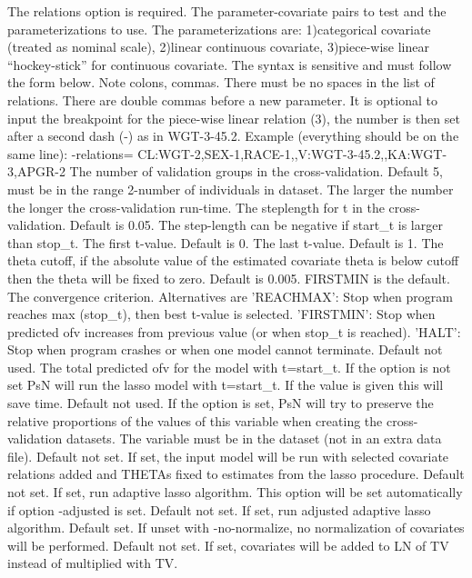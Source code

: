 \begin{optionlist}
The relations option is required. The parameter-covariate pairs to test and the parameterizations to use. The parameterizations are: 1)categorical covariate (treated as nominal scale), 2)linear continuous covariate, 3)piece-wise linear “hockey-stick” for continuous covariate. The syntax is sensitive and must follow the form below. Note colons, commas. There must be no spaces in the list of relations. There are double commas before a new parameter. It is optional to input the breakpoint for the piece-wise linear relation (3), the number is then set after a second dash (-) as in WGT-3-45.2. Example (everything should be on the same line):		-relations= CL:WGT-2,SEX-1,RACE-1,,V:WGT-3-45.2,,KA:WGT-3,APGR-2 
\nextopt
{}
The number of validation groups in the cross-validation. Default 5, must be in the range 2-number of individuals in dataset. The larger the number the longer the cross-validation run-time. 
\nextopt
{}
The steplength for t in the cross-validation. Default is 0.05. The step-length can be negative if start\_t is larger than stop\_t. 
\nextopt
{}
The first t-value. Default is 0. 
\nextopt
{}
The last t-value. Default is 1. 
\nextopt
{}
The theta cutoff, if the absolute value of the estimated covariate theta is below cutoff then the theta will be fixed to zero. Default is 0.005. 
\nextopt
{}
FIRSTMIN is the default. The convergence criterion. Alternatives are 'REACHMAX': Stop when program reaches max (stop\_t), then best t-value is selected. 'FIRSTMIN': Stop when predicted ofv increases from previous value (or when stop\_t is reached). 'HALT': Stop when program crashes or when one model cannot terminate. 
\nextopt
{}
Default not used. The total predicted ofv for the model with t=start\_t.  If the option is not set PsN will run the lasso model with t=start\_t. If the value is given this will save time. 
\nextopt
{}
Default not used. If the option is set, PsN will try to preserve the relative proportions of the values of this variable when creating the cross-validation datasets. The variable must be in the dataset (not in an extra data file). 
\nextopt
{}
Default not set. If set, the input model will be run with selected covariate
relations added and THETAs fixed to estimates from the lasso procedure.
\nextopt
{}
Default not set. If set, run adaptive lasso algorithm. This option will be set automatically if option -adjusted is set.
\nextopt
{}
Default not set. If set, run adjusted adaptive lasso algorithm.
\nextopt
{}
Default set. If unset with -no-normalize, no normalization of covariates will
be performed.
\nextopt
{}
Default not set. If set, covariates will be added to LN of TV instead
of multiplied with TV.
\nextopt
\end{optionlist}

